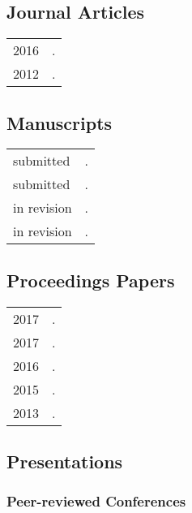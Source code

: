 \documentclass[11pt,a4paper,twoside]{article}
\makeatletter
\newenvironment{cvsection}{%
  \setlength{\extrarowheight}{0.70ex}
  \begin{longtable}[l]{@{} L R @{}}
}{%
  \end{longtable}
}
\makeatother
\begin{document}
\subsection*{Journal Articles}

\begin{cvsection}
  2016 & .\\
  2012 & .\\
\end{cvsection}

\subsection*{Manuscripts}

\begin{cvsection}
  submitted & .\\
  submitted & .\\
  in revision & .\\
  in revision & .\\
\end{cvsection}

\subsection*{Proceedings Papers}

\begin{cvsection}
  2017 & .\\
  2017 & .\\
  2016 & .\\
  2015 & .\\
  2013 & .\\
\end{cvsection}

\subsection*{Presentations}

\subsubsection*{Peer-reviewed Conferences}
\end{document}
